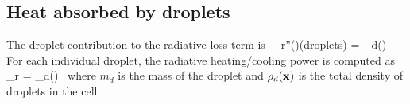 \subsection{Heat absorbed by droplets}

The droplet contribution to the radiative
loss term is
\be -\nabla\!\cdot \dbq_r''(\bx)(\mbox{droplets}) =
    \kappa_d(\bx) \, \left[ U(\bx) - 4 \pi \, I_{b,d}(\bx) \right]
\ee
For each individual droplet, the radiative heating/cooling power is
computed as
\be
\dq_r = 
    \kappa_d(\bx) \, \left[ U(\bx) - 4\pi \, I_{b,d}(\bx) \right]
\ee
where $m_d$ is the mass of the droplet and $\rho_d({\bf x})$ is the total
density of droplets in the cell.\\





